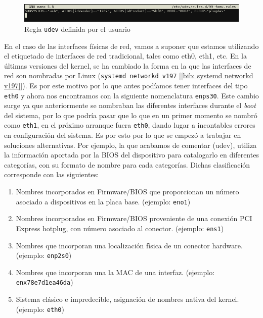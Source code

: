 \documentclass[a4paper, oneside, 12pt]{book}
\begin{document}
	\begin{figure}[h!]
		\begin{center}
			\includegraphics[width=1\textwidth]{img/udev_rule.png}
			\caption{Regla \texttt{udev} definida por el usuario} 
			\label{img: udev rule}
		\end{center}
	\end{figure}
	
	\noindent En el caso de las interfaces físicas de red, vamos a suponer que estamos utilizando el etiquetado de interfaces de red tradicional, tales como eth0, eth1, etc. En la últimas versiones del kernel, se ha cambiado la forma en la que las interfaces de red son nombradas por Linux (\texttt{systemd networkd v197} [\ref{bib: systemd networkd v197}]). Es por este motivo por lo que antes podíamos tener interfaces del tipo \texttt{eth0} y ahora nos encontramos con la siguiente nomenclatura \texttt{enps30}. Este cambio surge ya que anteriormente se nombraban las diferentes interfaces durante el \textit{boot} del sistema, por lo que podría pasar que lo que en un primer momento se nombró como \texttt{eth1}, en el próximo arranque fuera \texttt{eth0}, dando lugar a incontables errores en configuración del sistema. Es por esto por lo que se empezó a trabajar en soluciones alternativas. Por ejemplo, la que acabamos de comentar (udev), utiliza la información aportada por la BIOS del dispositivo para catalogarlo en diferentes categorías, con su formato de nombre para cada categorías. Dichas clasificación corresponde con las siguientes:
	\begin{enumerate}
		\item Nombres incorporados en Firmware/BIOS que proporcionan un número asociado a dispositivos en la placa base. (ejemplo: \texttt{eno1})
		\item Nombres incorporados en Firmware/BIOS proveniente de una conexión PCI Express hotplug, con número asociado al conector. (ejemplo: \texttt{ens1})
		\item Nombres que incorporan una localización física de un conector hardware. (ejemplo: \texttt{enp2s0})
		\item Nombres que incorporan una la MAC de una interfaz. (ejemplo: \texttt{enx78e7d1ea46da})
		\item Sistema clásico e impredecible, asignación de nombres nativa del kernel. (ejemplo: \texttt{eth0})
	\end{enumerate}
	
\end{document}
